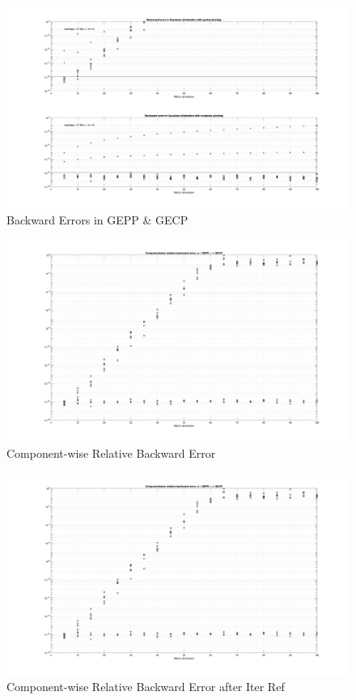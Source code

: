 \documentclass[12pt,letterpaper,reqno]{amsart}
\begin{document}
\newpage
\begin{landscape}
\begin{figure}[h]
        \includegraphics[scale = 0.25]{BE_GEPP_GECP.png}
        \caption{Backward Errors in GEPP \& GECP}
\end{figure}
\end{landscape}

\newpage
\begin{landscape}
\begin{figure}[h]
        \includegraphics[scale = 0.25]{CWRBE.png}
        \caption{Component-wise Relative Backward Error}
\end{figure}
\end{landscape}

\newpage
\begin{landscape}
\begin{figure}[h]
        \includegraphics[scale = 0.25]{CWRBE.png}
        \caption{Component-wise Relative Backward Error after Iter Ref}
\end{figure}
\end{landscape}
\end{document}
